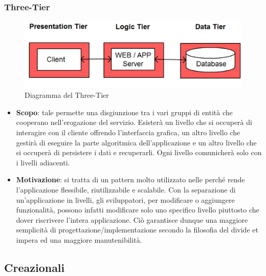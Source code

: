		\subsubsection{Three-Tier}
		\begin{figure}[H]
		\centering
		\includegraphics[width=0.6\linewidth]{GraficiAppendici/3-tier.png}
		\caption{Diagramma del  Three-Tier}
	\end{figure}
		\begin{itemize}
		\item \textbf{Scopo}: tale  permette una disgiunzione tra i vari gruppi di
entità che cooperano nell’erogazione del servizio. Esisterà un livello che si occuperà
di interagire con il cliente offrendo l’interfaccia grafica, un altro livello che gestirà
di eseguire la parte algoritmica dell’applicazione e un altro livello che si occuperà di
persistere i dati e recuperarli. Ogni livello comunicherà solo con i livelli adiacenti.

	\item \textbf{Motivazione}: si tratta di un pattern molto utilizzato nelle  perché rende l’applicazione flessibile, riutilizzabile e scalabile. Con la separazione di un’applicazione in livelli, gli sviluppatori, per modificare o aggiungere funzionalità, possono infatti modificare solo uno specifico livello piuttosto che dover riscrivere l’intera applicazione. Ciò garantisce dunque una maggiore semplicità di progettazione/implementazione secondo la filosofia del divide et impera ed una maggiore manutenibilità.
		\end{itemize}
	\subsection{ Creazionali}
	
